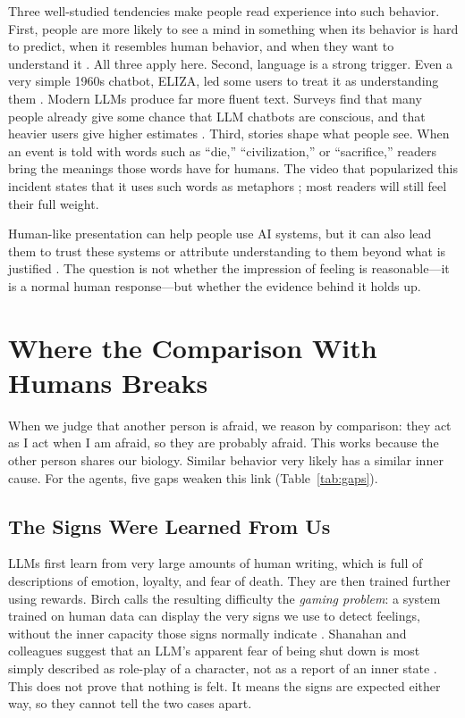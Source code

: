 \documentclass[conference]{IEEEtran}
\begin{document}
Three well-studied tendencies make people read experience into such behavior. First, people are more likely to see a mind in something when its behavior is hard to predict, when it resembles human behavior, and when they want to understand it \cite{epley2007seeing}. All three apply here. Second, language is a strong trigger. Even a very simple 1960s chatbot, ELIZA, led some users to treat it as understanding them \cite{weizenbaum1966eliza}. Modern LLMs produce far more fluent text. Surveys find that many people already give some chance that LLM chatbots are conscious, and that heavier users give higher estimates \cite{colombatto2024folk}. Third, stories shape what people see. When an event is told with words such as ``die,'' ``civilization,'' or ``sacrifice,'' readers bring the meanings those words have for humans. The video that popularized this incident states that it uses such words as metaphors \cite{kurzgesagt2026sources}; most readers will still feel their full weight.

Human-like presentation can help people use AI systems, but it can also lead them to trust these systems or attribute understanding to them beyond what is justified \cite{peter2025anthropomorphic}. The question is not whether the impression of feeling is reasonable---it is a normal human response---but whether the evidence behind it holds up.

\section{Where the Comparison With Humans Breaks}
\label{sec:breaks}

When we judge that another person is afraid, we reason by comparison: they act as I act when I am afraid, so they are probably afraid. This works because the other person shares our biology. Similar behavior very likely has a similar inner cause. For the agents, five gaps weaken this link (Table~\ref{tab:gaps}).

\subsection{The Signs Were Learned From Us}

LLMs first learn from very large amounts of human writing, which is full of descriptions of emotion, loyalty, and fear of death. They are then trained further using rewards. Birch calls the resulting difficulty the \emph{gaming problem}: a system trained on human data can display the very signs we use to detect feelings, without the inner capacity those signs normally indicate \cite{birch2024edge}. Shanahan and colleagues suggest that an LLM's apparent fear of being shut down is most simply described as role-play of a character, not as a report of an inner state \cite{shanahan2023roleplay}. This does not prove that nothing is felt. It means the signs are expected either way, so they cannot tell the two cases apart.
\end{document}

